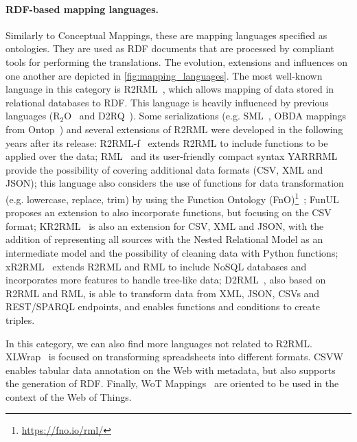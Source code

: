 \noindent\paragraph{\textbf{RDF-based mapping languages.}} Similarly to Conceptual Mappings, these are mapping languages specified as ontologies. They are used as RDF documents that are processed by compliant tools for performing the translations. The evolution, extensions and influences on one another are depicted in \cref{fig:mapping_languages}. The most well-known language in this category is R2RML~\citep{das2012r2rml}, which allows mapping of data stored in relational databases to RDF. This language is heavily influenced by previous languages (R$_2$O~\citep{barrasa2004r2o} and D2RQ~\citep{bizer2004d2rq}). Some serializations (e.g. SML~\citep{Stadler2015sml}, OBDA mappings from Ontop~\citep{rodriguez2015efficient}) and several extensions of R2RML were developed in the following years after its release: R2RML-f~\citep{debruyne2016r2rmlf} extends R2RML to include functions to be applied over the data; RML~\citep{Dimou2014rml} and its user-friendly compact syntax YARRRML~\citep{Heyvaert2018yarrrml} provide the possibility of covering additional data formats (CSV, XML and JSON); this language also considers the use of functions for data transformation (e.g. lowercase, replace, trim) by using the Function Ontology (FnO)\footnote{\url{https://fno.io/rml/}}~\citep{DeMeester2017fno_dbpedia}; FunUL~\citep{junior2016funul} proposes an extension to also incorporate functions, but focusing on the CSV format; KR2RML~\citep{slepicka2015kr2rml} is also an extension for CSV, XML and JSON, with the addition of representing all sources with the Nested Relational Model as an intermediate model and the possibility of cleaning data with Python functions; xR2RML~\citep{michel2015xr2rml} extends R2RML and RML to include NoSQL databases and incorporates more features to handle tree-like data; D2RML~\citep{chortaras2018d2rml}, also based on R2RML and RML, is able to transform data from XML, JSON, CSVs and REST/SPARQL endpoints, and enables functions and conditions to create triples. 

In this category, we can also find more languages not related to R2RML. XLWrap~\citep{langegger2009xlwrap} is focused on transforming spreadsheets into different formats. CSVW~\citep{Tennison2015csvw} enables tabular data annotation on the Web with metadata, but also supports the generation of RDF. Finally, WoT Mappings~\citep{cimmino2020ewot} are oriented to be used in the context of the Web of Things.

